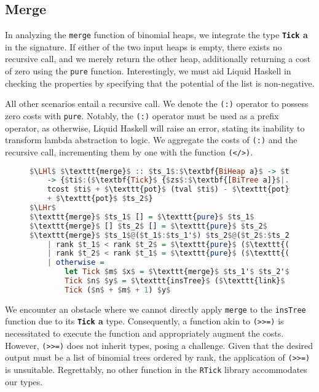 \documentclass{clmthesis}
\begin{document}
\subsection{Merge}
In analyzing the \texttt{merge} function of binomial heaps, we integrate the type \textbf{\lstinline{Tick} a} in the signature. If either of the two input heaps is empty, there exists no recursive call, and we merely return the other heap, additionally returning a cost of zero using the \texttt{pure} function. Interestingly, we must aid Liquid Haskell in checking the properties by specifying that the potential of the list is non-negative.

All other scenarios entail a recursive call. We denote the \texttt{(:)} operator to possess zero costs with \texttt{pure}. Notably, the \texttt{(:)} operator must be used as a prefix operator, as otherwise, Liquid Haskell will raise an error, stating its inability to transform lambda abstraction to logic. We aggregate the costs of \texttt{(:)} and the recursive call, incrementing them by one with the function \texttt{(</>)}.
\begin{figure}[h]
\begin{lstlisting}[mathescape=true, language=haskell, caption={Amortized cost analysis of \texttt{merge}.},captionpos=b, label=fig:BmergePot]
$\LHl$ $\texttt{merge}$ :: $ts_1$:$\textbf{BiHeap a}$ -> $ts_2$:$\textbf{BiHeap a}$ 
	-> {$ti$:($\textbf{Tick}$ {$zs$:$\textbf{[BiTree a]}$|...}) | $\texttt{ordRankH}$ (tval $ti$) &&
	tcost $ti$ + $\texttt{pot}$ (tval $ti$) - $\texttt{pot}$ $ts_1$  - $\texttt{pot}$ $ts_2$ $\leq$ $\texttt{pot}$ $ts_1$ 
	+ $\texttt{pot}$ $ts_2$} 
$\LHr$
$\texttt{merge}$ $ts_1$ [] = $\texttt{pure}$ $ts_1$
$\texttt{merge}$ [] $ts_2$ [] = $\texttt{pure}$ $ts_2$
$\texttt{merge}$ $ts_1$@($t_1$:$ts_1'$) $ts_2$@($t_2$:$ts_2'$)
	| rank $t_1$ < rank $t_2$ = $\texttt{pure}$ ($\texttt{(:)}$ $t_1$) $\texttt{</>}$ $\texttt{merge}$ $ts_1'$ $ts_2$
	| rank $t_2$ < rank $t_1$ = $\texttt{pure}$ ($\texttt{(:)}$ $t_2$) $\texttt{</>}$ $\texttt{merge}$ $ts_1$ $ts_2'$
	| otherwise =
		let Tick $m$ $x$ = $\texttt{merge}$ $ts_1'$ $ts_2'$
		Tick $n$ $y$ = $\texttt{insTree}$ ($\texttt{link}$ $t_1$ $t_2$) $x$ in
		Tick ($n$ + $m$ + 1) $y$
\end{lstlisting}
\end{figure}
We encounter an obstacle where we cannot directly apply \texttt{merge} to the \texttt{insTree} function due to its \textbf{\lstinline{Tick} a} type. Consequently, a function akin to \texttt{(>>=)} is necessitated to execute the function and appropriately augment the costs. However, \texttt{(>>=)} does not inherit types, posing a challenge. Given that the desired output must be a list of binomial trees ordered by rank, the application of \texttt{(>>=)} is unsuitable. Regrettably, no other function in the \texttt{RTick} library accommodates our types.
\end{document}
